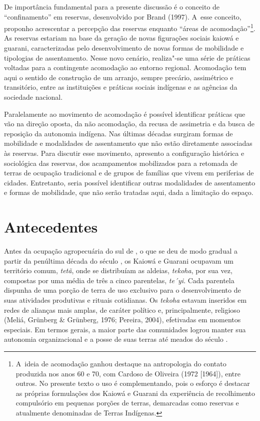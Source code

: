 De importância fundamental para a presente discussão é o conceito de
``confinamento'' em reservas, desenvolvido por Brand (1997). A~esse
conceito, proponho acrescentar a percepção das reservas enquanto ``áreas
de acomodação''\footnote{A~ideia de acomodação ganhou destaque na
antropologia do contato produzida nos anos 60 e 70, com Cardoso de
Oliveira (1972 [1964]), entre outros. No presente texto o uso é
complementando, pois o esforço é destacar as próprias formulações dos
Kaiowá e Guarani da experiência de recolhimento compulsório em pequenas
porções de terras, demarcadas como reservas e atualmente denominadas de
Terras Indígenas.}. As reservas estariam na base da geração de novas
figurações sociais kaiowá e guarani, caracterizadas pelo
desenvolvimento de novas formas de mobilidade e tipologias de
assentamento. Nesse novo cenário, realiza"-se uma série de práticas
voltadas para a contingente acomodação ao entorno regional. Acomodação
tem aqui o sentido de construção de um arranjo, sempre precário,
assimétrico e transitório, entre as instituições e práticas sociais
indígenas e as agências da sociedade nacional.

Paralelamente ao movimento de acomodação é possível identificar práticas
que vão na direção oposta, da não acomodação, da recusa de assimetria e
da busca de reposição da autonomia indígena. Nas últimas décadas
surgiram formas de mobilidade e modalidades de assentamento que não
estão diretamente associadas às reservas. Para discutir esse movimento,
apresento a configuração histórica e sociológica das reservas, dos
acampamentos mobilizados para a retomada de terras de ocupação
tradicional e de grupos de famílias que vivem em periferias de cidades.
Entretanto, seria possível identificar outras modalidades de
assentamento e formas de mobilidade, que não serão tratadas aqui, dada
a limitação do espaço. 

\section{Antecedentes}

Antes da ocupação agropecuária do sul de , o que se deu de modo
gradual a partir da penúltima década do século , os Kaiowá e Guarani
ocupavam um território comum, \emph{tetã}, onde se distribuíam as aldeias,
\emph{tekoha}, por sua vez, compostas por uma média de três a cinco
parentelas, \emph{te´yi}. Cada parentela dispunha de uma porção de terra de
uso exclusivo para o desenvolvimento de suas atividades produtivas e
rituais cotidianas. Os \emph{tekoha} estavam inseridos em redes de alianças
mais amplas, de caráter político e, principalmente, religioso (Meliá,
Grünberg \& Grünberg, 1976; Pereira, 2004), efetivadas em momentos
especiais. Em termos gerais, a maior parte das comunidades logrou
manter sua autonomia organizacional e a posse de suas terras até meados
do século .

